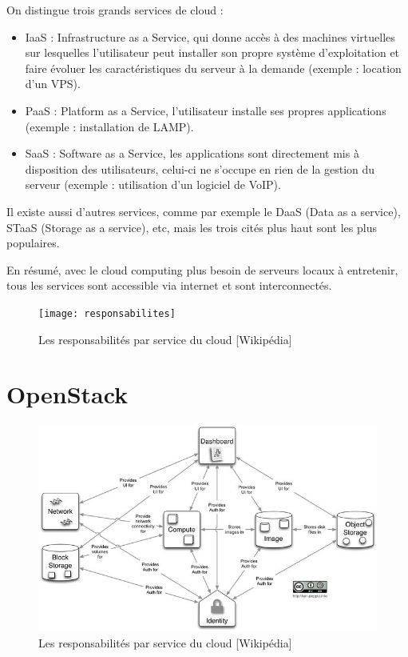 \documentclass{report}
\begin{document}
    On distingue trois grands services de cloud :
    \begin{itemize}
        \item IaaS : Infrastructure as a Service, qui donne accès à des machines virtuelles sur lesquelles l'utilisateur peut installer son propre système d'exploitation et faire évoluer les caractéristiques du serveur à la demande (exemple : location d'un VPS).
        \item PaaS : Platform as a Service, l'utilisateur installe ses propres applications (exemple : installation de LAMP).
        \item SaaS : Software as a Service, les applications sont directement mis à disposition des utilisateurs, celui-ci ne s'occupe en rien de la gestion du serveur (exemple : utilisation d'un logiciel de VoIP).
    \end{itemize}
    \bigbreak
    
    Il existe aussi d'autres services, comme par exemple le DaaS (Data as a service), STaaS (Storage as a service), etc, mais les trois cités plus haut sont les plus populaires.\break
    
    En résumé, avec le cloud computing plus besoin de serveurs locaux à entretenir, tous les services sont accessible via internet et sont interconnectés.\break
    
    \begin{figure}
        \texttt{[image: responsabilites]}
        \caption{Les responsabilités par service du cloud [Wikipédia]}
    \end{figure}


\newpage
\chapter{OpenStack}
    \begin{figure}
        \includegraphics[width=\textwidth]{openstack_arch}
        \caption{Les responsabilités par service du cloud [Wikipédia]}
    \end{figure}
\end{document}
